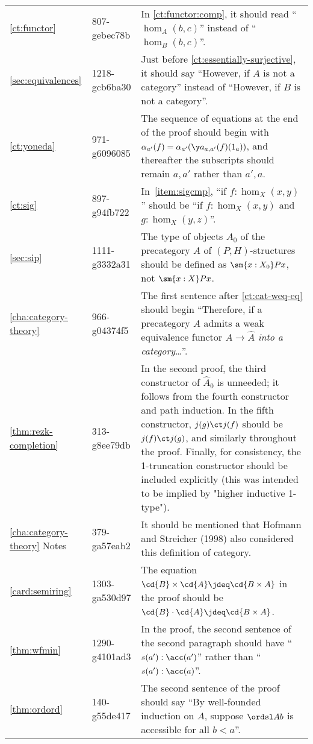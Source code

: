 \documentclass[
%
%
11pt %
]{article}
\begin{document}
\begin{longtable}{llp{10.5cm}}
  \cref{ct:functor}
  & 807-gebec78b
  & In \cref{ct:functor:comp}, it should read ``$\hom_A(b,c)$'' instead of ``$\hom_B(b,c)$''.\\
  \cref{sec:equivalences}
  & 1218-gcb6ba30
  & Just before \cref{ct:essentially-surjective}, it should say ``However, if $A$ is not a category'' instead of ``However, if $B$ is not a category''.\\
  \cref{ct:yoneda}
  & 971-g6096085
  & The sequence of equations at the end of the proof should begin with $\alpha_{a'}(f) = \alpha_{a'} (\y a_{a,a'}(f)(1_a))$, and thereafter the subscripts should remain $a,a'$ rather than $a',a$.\\
  \cref{ct:sig}
  & 897-g94fb722
  & In~\ref{item:sigcmp}, ``if $f:\hom_X(x,y)$'' should be ``if $f:\hom_X(x,y)$ and $g:\hom_X(y,z)$''.\\
  \cref{sec:sip}
  & 1111-g3332a31
  & The type of objects $A_0$ of the precategory $A$ of $(P,H)$-structures should be defined as $\sm{x:X_0} Px$, not $\sm{x:X} Px$.\\
  \cref{cha:category-theory}
  & 966-g04374f5
  & The first sentence after \cref{ct:cat-weq-eq} should begin ``Therefore, if a precategory $A$ admits a weak equivalence functor $A\to \widehat{A}$ \emph{into a category}\dots''.\\
  \cref{thm:rezk-completion}
  & 313-g8ee79db
  & In the second proof, the third constructor of $\widehat A_0$ is unneeded; it follows from the fourth constructor and path induction.
  In the fifth constructor, $j(g)\ct j(f)$ should be $j(f)\ct j(g)$, and similarly throughout the proof.
  Finally, for consistency, the 1-truncation constructor should be included explicitly (this was intended to be implied by "higher inductive 1-type").\\
  \cref{cha:category-theory} Notes
  & 379-ga57eab2
  & It should be mentioned that Hofmann and Streicher (1998) also considered this definition of category.\\
  \cref{card:semiring}
  & 1303-ga530d97
  & The equation $\cd{B}\times\cd{A} \jdeq \cd{B\times A}$ in the proof should be $\cd{B}\cdot\cd{A} \jdeq \cd{B\times A}$.\\
  \cref{thm:wfmin}
  & 1290-g4101ad3
  & In the proof, the second sentence of the second paragraph should have ``$s(a'):\acc(a')$'' rather than ``$s(a'):\acc(a)$''.\\
  \cref{thm:ordord}
  & 140-g55de417
  & The second sentence of the proof should say ``By well-founded induction on $A$, suppose $\ordsl A b$ is accessible for all $b<a$''.\\

\end{longtable}
\end{document}
